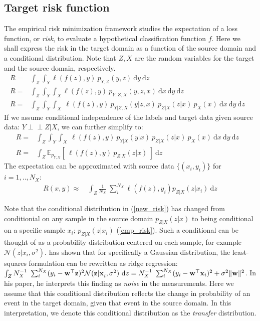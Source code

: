 \documentclass[twoside,11pt]{article}
\def\ci{\perp\!\!\!\perp}
\begin{document}
\subsection{Target risk function}
The empirical risk minimization framework studies the expectation of a loss function, or \emph{risk}, to evaluate a hypothetical classification function $f$. Here we shall express the risk in the target domain as a function of the source domain and a conditional distribution. Note that $Z,X$ are the random variables for the target and the source domain, respectively.
\begin{align}
R =& \int_{Z}\int_{Y}\ell(f(z),y) \ p_{Y,Z}(y,z) \ \mathrm{d}y \ \mathrm{d}z  & \nonumber \\
R=& \int_{Z}\int_{Y}\int_{X} \ell(f(z),y) \ p_{Y,Z,X}(y,z,x) \ \mathrm{d}x \ \mathrm{d}y \ \mathrm{d}z & \nonumber \\
R =& \int_{Z}\int_{Y}\int_{X} \ \ell(f(z),y) \ p_{Y|Z,X}(y|z,x) \ p_{Z|X}(z|x)  \ p_{X}(x) \ \mathrm{d}x \ \mathrm{d}y \ \mathrm{d}z & \nonumber 
\end{align}
If we assume conditional independence of the labels and target data given source data: $Y \ci Z | X$, we can further simplify to:
\begin{align}
R =& \int_{Z}\int_{Y}\int_{X} \ \ell(f(z),y) \ p_{Y|X}(y|x) \ p_{Z|X}(z|x)  \ p_{X}(x) \ \mathrm{d}x \ \mathrm{d}y \ \mathrm{d}z &  \nonumber \\
R =& \int_{Z} \mathbb{E}_{p_{Y,X}}\left[ \ \ell(f(z),y) \ p_{Z|X}(z|x) \ \right] \ \mathrm{d}z & \label{new_risk} 
\end{align}
The expectation can be approximated with source data $\{(x_{i},y_{i})\}$ for $i=1,.. , N_{X}$:
\begin{align}
R(x,y) \approx &\  \int_{Z} \frac{1}{N_{X}} \ \sum_{i}^{N_{X}} \ell(f(z),y_{i}) p_{Z|X} (z|x_{i}) \ \mathrm{d}z \label{emp_risk}
\end{align}

Note that the conditional distribution in (\ref{new_risk}) has changed from conditionial on any sample in the source domain $p_{Z|X}(z|x)$ to being conditional on a specific sample $x_{i}$; $p_{Z|X}(z|x_{i})$ (\ref{emp_risk}). Such a conditional can be thought of as a probability distribution centered on each sample, for example $\mathcal{N}(z| x_{i}, \sigma^{2})$. \cite{bishop1995training} has shown that for specifically a Gaussian distribution, the least-squares formulation can be rewritten as ridge regression: $\int_{Z} N_{X}^{-1} \ \sum_{i}^{N_{X}} (y_{i}-{\bf w^{\top}z})^{2} \mathcal{N}({\bf z|x}_{i}, \sigma^{2}) \ \mathrm{d}z = N_{X}^{-1} \ \sum_{i}^{N_{X}} (y_{i}-{\bf w^{\top}x}_{i})^{2} + \sigma^{2}\|{\bf w} \|^{2}$. In his paper, he interprets this finding as \emph{noise} in the measurements. Here we assume that this conditional distribution reflects the change in probability of an event in the target domain, given that event in the source domain. In this interpretation, we denote this conditional distribution as the \emph{transfer} distribution. 
\end{document}

